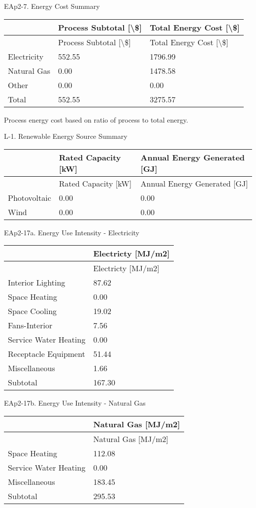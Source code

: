 EAp2-7. Energy Cost Summary

\begin{longtable}[c]{>{\raggedright}p{1.5in}>{\raggedright}p{2.21in}>{\raggedright}p{2.28in}}
\toprule 
 & Process Subtotal [\textbackslash\$] & Total Energy Cost [\textbackslash\$] \tabularnewline
\midrule
\endfirsthead

\toprule 
 & Process Subtotal [\textbackslash\$] & Total Energy Cost [\textbackslash\$] \tabularnewline
\midrule
\endhead

Electricity & 552.55 & 1796.99 \tabularnewline
Natural Gas & 0.00 & 1478.58 \tabularnewline
Other & 0.00 & 0.00 \tabularnewline
Total & 552.55 & 3275.57 \tabularnewline
\bottomrule
\end{longtable}

Process energy cost based on ratio of process to total energy.

L-1. Renewable Energy Source Summary

\begin{longtable}[c]{@{}lll@{}}
\toprule 
 & Rated Capacity [kW] & Annual Energy Generated [GJ] \tabularnewline
\midrule
\endfirsthead

\toprule 
 & Rated Capacity [kW] & Annual Energy Generated [GJ] \tabularnewline
\midrule
\endhead

Photovoltaic & 0.00 & 0.00 \tabularnewline
Wind & 0.00 & 0.00 \tabularnewline
\bottomrule
\end{longtable}

EAp2-17a. Energy Use Intensity - Electricity

\begin{longtable}[c]{@{}ll@{}}
\toprule 
 & Electricty [MJ/m2] \tabularnewline
\midrule
\endfirsthead

\toprule 
 & Electricty [MJ/m2] \tabularnewline
\midrule
\endhead

Interior Lighting & 87.62 \tabularnewline
Space Heating & 0.00 \tabularnewline
Space Cooling & 19.02 \tabularnewline
Fans-Interior & 7.56 \tabularnewline
Service Water Heating & 0.00 \tabularnewline
Receptacle Equipment & 51.44 \tabularnewline
Miscellaneous & 1.66 \tabularnewline
Subtotal & 167.30 \tabularnewline
\bottomrule
\end{longtable}

EAp2-17b. Energy Use Intensity - Natural Gas

\begin{longtable}[c]{@{}ll@{}}
\toprule 
 & Natural Gas [MJ/m2] \tabularnewline
\midrule
\endfirsthead

\toprule 
 & Natural Gas [MJ/m2] \tabularnewline
\midrule
\endhead

Space Heating & 112.08 \tabularnewline
Service Water Heating & 0.00 \tabularnewline
Miscellaneous & 183.45 \tabularnewline
Subtotal & 295.53 \tabularnewline
\bottomrule
\end{longtable}

